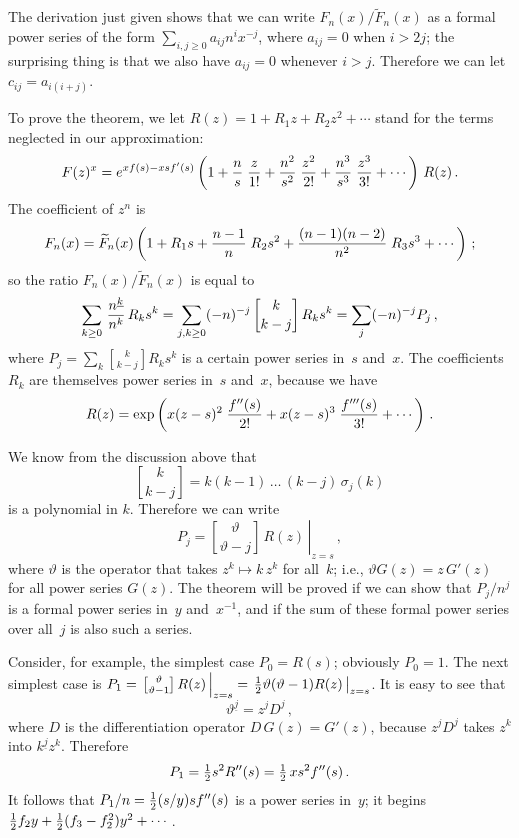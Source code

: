 The derivation just given shows that we can write
$F_n(x)/\widetilde{F}_n(x)$ as a formal power series of the form
$\sum_{i,j\geq 0}a_{ij}n^ix^{-j}$, where $a_{ij}=0$ when $i>2j$; the
surprising thing is that we also have $a_{ij}=0$ whenever $i>j$.
Therefore we can let $c_{ij}=a_{i(i+j)}$.

To prove the theorem, we let $R(z)=1+R_1z+R_2z^2+\cdots$ stand for the
terms neglected in our approximation:
$$F(z)^x=e^{xf(s)-xsf'(s)}\left(1+{n\over s}\;{z\over 1!}+{n^2\over
s^2}\;{z^2\over 2!}+{n^3\over s^3}\;{z^3\over
3!}+\cdots\,\right)\,R(z)\,.$$
The coefficient of $z^n$ is
$$F_n(x)=\widetilde{F}_n(x)\left(1+R_1s+{n-1\over
n}\;R_2s^2+{(n-1)(n-2)\over n^2}\;R_3s^3+\cdots\,\right)\,;$$
so the ratio $F_n(x)/\widetilde{F}_n(x)$ is equal to
$$\sum_{k\geq 0}\,{n^{\underline{k}}\over n^k}\,R_ks^k=\sum_{j,k\geq
0}(-n)^{-j}\,{k\brack k-j}\,R_ks^k=\sum_j(-n)^{-j}P_j\,,$$
where $P_j=\sum_k{k\brack k-j}R_ks^k$ is a certain power series in~$s$
and~$x$. The coefficients~$R_k$ are themselves power series in~$s$
and~$x$, because we have
$$R(z)=\exp\left(x(z-s)^2\;{f''(s)\over 2!}+x(z-s)^3\;{f'''(s)\over
3!}+\cdots\,\right)\,.$$

We know from the discussion above that
$${k\brack k-j}=k(k-1)\,\ldots\,(k-j)\,\sigma_j(k)$$
is a polynomial in $k$. Therefore we can write
$$P_j=\left.{\vartheta\brack\vartheta-j}\,R(z)\,\right\vert_{z=s}\,,$$
where $\vartheta$ is the operator that takes $z^k\mapsto k\,z^k$ for
all~$k$; i.e., $\vartheta G(z)=z\,G'(z)$ for all power series $G(z)$.
The theorem will be proved if we can show that $P_j/n^j$ is a formal
power series in~$y$ and~$x^{-1}$, and if the sum of these formal power
series over all~$j$ is also such a series.

Consider, for example, the simplest case $P_0=R(s)$; obviously
$P_0=1$. The next simplest case is
$P_1=\left.{\vartheta\brack\vartheta-1}\,R(z)\,\right\vert_{z=s}=
\left.{1\over 2}\vartheta(\vartheta-1)R(z)\,\right\vert_{z=s}$. It is
easy to see that
$$\vartheta^{\underline{j}}=z^jD^j\,,$$
where $D$ is the differentiation operator $D\,G(z)=G'(z)$, because
$z^jD^j$ takes $z^k$ into $k^{\underline{j}}z^k$. Therefore
$$P_1={\textstyle{1\over 2}} s^2R''(s)={\textstyle{1\over
2}}\,xs^2f''(s)\,.$$ 
It follows that $P_1/n={1\over 2}(s/y)sf''(s)$ is a power series
in~$y$; it begins ${1\over 2}f_2y+{1\over 2}(f_3-f_2^2)y^2+\cdots\;$.

